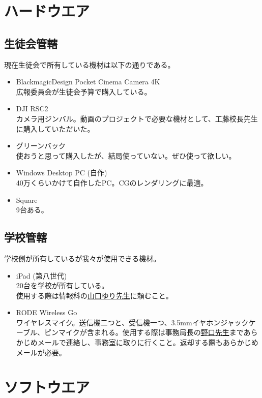 \documentclass[dvipdfmx,jb5]{jreport}
\newcommand{\mail}[2]{\href{mailto:#2}{#1}}
\begin{document}
\section{ハードウエア}
\subsection{生徒会管轄}
現在生徒会で所有している機材は以下の通りである。
\begin{itemize}
      \item BlackmagicDesign Pocket Cinema Camera 4K\\
            広報委員会が生徒会予算で購入している。
      \item DJI RSC2\\
            カメラ用ジンバル。動画のプロジェクトで必要な機材として、工藤校長先生に購入していただいた。
      \item グリーンバック\\
            使おうと思って購入したが、結局使っていない。ぜひ使って欲しい。
      \item Windows Desktop PC (自作)\\
            40万くらいかけて自作したPC。CGのレンダリングに最適。
      \item Square\\
            9台ある。
\end{itemize}

\subsection{学校管轄}
学校側が所有しているが我々が使用できる機材。
\begin{itemize}
      \item iPad (第八世代)\\
            20台を学校が所有している。\\
            使用する際は情報科の\mail{山口ゆり先生}{yuri.yamaguchi@seiko.ac.jp}に頼むこと。
      \item RODE Wireless Go\\
            ワイヤレスマイク。送信機二つと、受信機一つ、3.5mmイヤホンジャックケーブル、ピンマイクが含まれる。使用する際は事務局長の\mail{野口先生}{noguchi@seiko.ac.jp}まであらかじめメールで連絡し、事務室に取りに行くこと。返却する際もあらかじめメールが必要。
\end{itemize}

\section{ソフトウエア}
\end{document}
